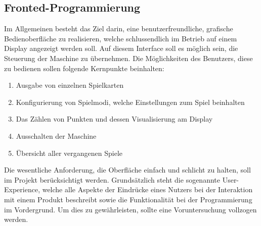 \subsection{Fronted-Programmierung}\label{subsec:fronted-programmierung}
Im Allgemeinen besteht das Ziel darin, eine benutzerfreundliche, grafische Bedienoberfläche zu realisieren, welche schlussendlich im Betrieb auf einem Display angezeigt werden soll.
Auf diesem Interface soll es möglich sein, die Steuerung der Maschine zu übernehmen.
Die Möglichkeiten des Benutzers, diese zu bedienen sollen folgende Kernpunkte beinhalten:
\begin{enumerate}
    \item Ausgabe von einzelnen Spielkarten
    \item Konfigurierung von Spielmodi, welche Einstellungen zum Spiel beinhalten
    \item Das Zählen von Punkten und dessen Visualisierung am Display
    \item Ausschalten der Maschine
    \item Übersicht aller vergangenen Spiele
\end{enumerate}
Die wesentliche Anforderung, die Oberfläche einfach und schlicht zu halten, soll im Projekt berücksichtigt werden.
Grundsätzlich steht die sogenannte User-Experience, welche alle Aspekte der Eindrücke eines Nutzers bei der Interaktion mit einem Produkt beschreibt sowie die Funktionalität bei der Programmierung im Vordergrund.
Um dies zu gewährleisten, sollte eine Voruntersuchung vollzogen werden.


